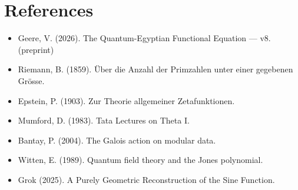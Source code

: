 \documentclass[12pt,a4paper]{article}
\theoremstyle{remark}
\begin{document}
\section{References}

\begin{itemize}
  \item Geere, V. (2026). The Quantum-Egyptian Functional Equation --- v8. (preprint)
  \item Riemann, B. (1859). Über die Anzahl der Primzahlen unter einer gegebenen Grösse.
  \item Epstein, P. (1903). Zur Theorie allgemeiner Zetafunktionen.
  \item Mumford, D. (1983). Tata Lectures on Theta I.
  \item Bantay, P. (2004). The Galois action on modular data.
  \item Witten, E. (1989). Quantum field theory and the Jones polynomial.
  \item Grok (2025). A Purely Geometric Reconstruction of the Sine Function.
\end{itemize}
\end{document}
